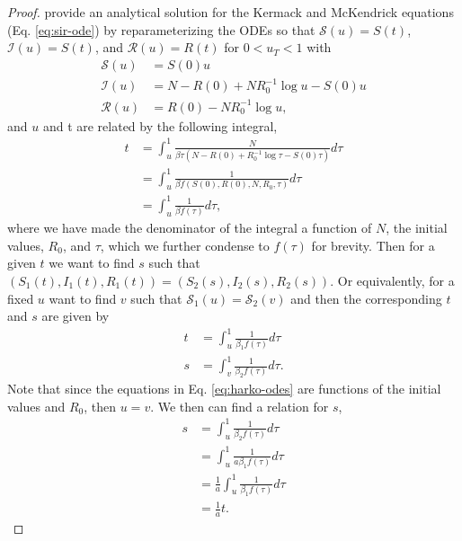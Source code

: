 \documentclass[
  shortnames]{jss}
\begin{document}
\begin{proof}\label{proof:thm}
\cite{Harko2014} provide an analytical solution for the Kermack and McKendrick equations (Eq. \eqref{eq:sir-ode}) by reparameterizing the ODEs so that $\mathcal{S}(u) = S(t)$, $\mathcal{I}(u) = S(t)$, and $\mathcal{R}(u) = R(t)$ for $0< u_T < 1$ with
\begin{align}\label{eq:harko-odes}
\mathcal{S}(u) &= S(0)u\\
\mathcal{I}(u) &= N - R(0) + NR_0^{-1}\log u - S(0)u \nonumber\\
\mathcal{R}(u) &= R(0) - NR_0^{-1} \log u, \nonumber
\end{align}
and $u$ and t are related by the following integral,
\begin{align*}
    t &= \int_{u}^1 \frac{N}{\beta \tau (N - R(0) + R_{0}^{-1} \log \tau - S(0)\tau)}d\tau \\
    &= \int_{u}^1 \frac{1}{\beta f(S(0), R(0), N, R_0, \tau)} d \tau\\
    &= \int_{u}^1 \frac{1}{\beta f(\tau)} d\tau,
\end{align*}
where we have made the denominator of the integral a function of $N$, the initial values, $R_0$, and $\tau$, which we further condense to $f(\tau)$ for brevity.
Then for a given $t$ we want to find $s$ such that $(S_1(t), I_1(t), R_1(t)) = (S_2(s), I_2(s), R_2(s))$.  Or equivalently, for a fixed $u$ want to find $v$ such that  $\mathcal{S}_1(u) = \mathcal{S}_2(v)$ and then the corresponding $t$ and $s$ are given by
\begin{align*}
    t & = \int_{u}^1 \frac{1}{\beta_1 f(\tau)} d\tau \\
    s & = \int_{v}^1 \frac{1}{\beta_2 f(\tau)} d\tau.
\end{align*}
Note that since the equations in Eq. \eqref{eq:harko-odes} are functions of the initial values and $R_0$, then $u = v$. We then can find a relation for $s$,
    \begin{align*}
    s & = \int_{u}^1 \frac{1}{\beta_2 f(\tau)} d\tau  \\
    & = \int_{u}^1 \frac{1}{a\beta_1 f(\tau)} d\tau \\ 
    &= \frac{1}{a}\int_{u}^1 \frac{1}{\beta_1 f(\tau)} d\tau \\
    &= \frac{1}{a}t.
\end{align*}
\end{proof}


\end{document}
